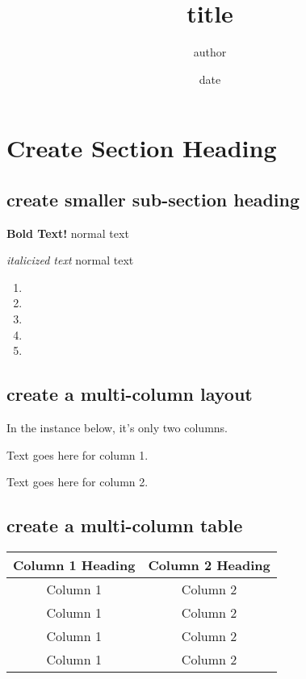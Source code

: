 \documentclass[12pt, letterpaper]{article}
\title{\vspace{-15pt}title}
\author{author}
\date{\vspace{-3pt}date}
\begin{document}
\maketitle

\section{Create Section Heading}
\subsection{create smaller sub-section heading}

\textbf{Bold Text!} normal text

\emph{italicized text} normal text

\begin{enumerate}
    \item 
    
    \item  
    
    \item  

    \item 

    \item 
    
\end{enumerate}

\vskip 10pt

\subsection{create a multi-column layout}
In the instance below, it's only two columns. 
\begin{multicols}{2}

Text goes here for column 1. 

\columnbreak

Text goes here for column 2. 

\end{multicols}

\vskip 10pt
\subsection{create a multi-column table}
\begin{center}
\begin{tabular}{ |c|c| }
\hline
Column 1 Heading & Column 2 Heading \\
\hline
Column 1 & Column 2 \\
\hline
Column 1 & Column 2 \\
\hline
Column 1 & Column 2 \\
\hline
Column 1 & Column 2 \\
\hline
\end{tabular}
\end{center}
\end{document}
